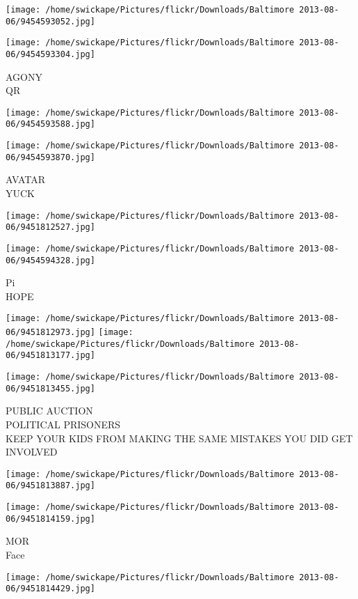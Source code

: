 \documentclass[10pt,letterpaper]{article}
\begin{document}
\texttt{[image: /home/swickape/Pictures/flickr/Downloads/Baltimore 2013-08-06/9454593052.jpg]}

\vspace{0.25in}
\texttt{[image: /home/swickape/Pictures/flickr/Downloads/Baltimore 2013-08-06/9454593304.jpg]}

AGONY\\
QR
\pagebreak

\texttt{[image: /home/swickape/Pictures/flickr/Downloads/Baltimore 2013-08-06/9454593588.jpg]}

\vspace{0.25in}
\texttt{[image: /home/swickape/Pictures/flickr/Downloads/Baltimore 2013-08-06/9454593870.jpg]}

AVATAR\\
YUCK
\pagebreak

\texttt{[image: /home/swickape/Pictures/flickr/Downloads/Baltimore 2013-08-06/9451812527.jpg]}

\vspace{0.25in}
\texttt{[image: /home/swickape/Pictures/flickr/Downloads/Baltimore 2013-08-06/9454594328.jpg]}

Pi\\
HOPE
\pagebreak

\texttt{[image: /home/swickape/Pictures/flickr/Downloads/Baltimore 2013-08-06/9451812973.jpg]}
\texttt{[image: /home/swickape/Pictures/flickr/Downloads/Baltimore 2013-08-06/9451813177.jpg]}

\texttt{[image: /home/swickape/Pictures/flickr/Downloads/Baltimore 2013-08-06/9451813455.jpg]}

PUBLIC AUCTION\\
POLITICAL PRISONERS\\
KEEP YOUR KIDS FROM MAKING THE SAME MISTAKES YOU DID GET INVOLVED
\pagebreak

\texttt{[image: /home/swickape/Pictures/flickr/Downloads/Baltimore 2013-08-06/9451813887.jpg]}

\vspace{0.25in}
\texttt{[image: /home/swickape/Pictures/flickr/Downloads/Baltimore 2013-08-06/9451814159.jpg]}

MOR\\
Face
\pagebreak

\texttt{[image: /home/swickape/Pictures/flickr/Downloads/Baltimore 2013-08-06/9451814429.jpg]}
\end{document}
